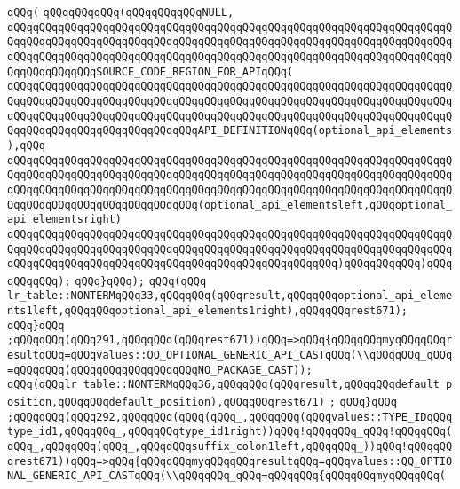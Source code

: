 \verb|qQQq(|\newline
\verb|qQQqqQQqqQQq(qQQqqQQqqQQqNULL,|\newline
\verb|qQQqqQQqqQQqqQQqqQQqqQQqqQQqqQQqqQQqqQQqqQQqqQQqqQQqqQQqqQQqqQQqqQQqqQQqqQQqqQQqqQQqqQQqqQQqqQQqqQQqqQQqqQQqqQQqqQQqqQQqqQQqqQQqqQQqqQQqqQQqqQQqqQQqqQQqqQQqqQQqqQQqqQQqqQQqqQQqqQQqqQQqqQQqqQQqqQQqqQQqqQQqqQQqqQQqqQQqqQQqqQQqSOURCE_CODE_REGION_FOR_APIqQQq(|\newline
\verb|qQQqqQQqqQQqqQQqqQQqqQQqqQQqqQQqqQQqqQQqqQQqqQQqqQQqqQQqqQQqqQQqqQQqqQQqqQQqqQQqqQQqqQQqqQQqqQQqqQQqqQQqqQQqqQQqqQQqqQQqqQQqqQQqqQQqqQQqqQQqqQQqqQQqqQQqqQQqqQQqqQQqqQQqqQQqqQQqqQQqqQQqqQQqqQQqqQQqqQQqqQQqqQQqqQQqqQQqqQQqqQQqqQQqqQQqqQQqqQQqAPI_DEFINITIONqQQq(optional_api_elements),qQQq|\newline
\verb|qQQqqQQqqQQqqQQqqQQqqQQqqQQqqQQqqQQqqQQqqQQqqQQqqQQqqQQqqQQqqQQqqQQqqQQqqQQqqQQqqQQqqQQqqQQqqQQqqQQqqQQqqQQqqQQqqQQqqQQqqQQqqQQqqQQqqQQqqQQqqQQqqQQqqQQqqQQqqQQqqQQqqQQqqQQqqQQqqQQqqQQqqQQqqQQqqQQqqQQqqQQqqQQqqQQqqQQqqQQqqQQqqQQqqQQqqQQqqQQq(optional_api_elementsleft,qQQqoptional_api_elementsright)|\newline
\verb|qQQqqQQqqQQqqQQqqQQqqQQqqQQqqQQqqQQqqQQqqQQqqQQqqQQqqQQqqQQqqQQqqQQqqQQqqQQqqQQqqQQqqQQqqQQqqQQqqQQqqQQqqQQqqQQqqQQqqQQqqQQqqQQqqQQqqQQqqQQqqQQqqQQqqQQqqQQqqQQqqQQqqQQqqQQqqQQqqQQqqQQqqQQqqQQq)qQQqqQQqqQQq)qQQqqQQqqQQq);|\newline
\verb|qQQq}qQQq);|\newline
\verb|qQQq(qQQq|\newline
\verb|lr_table::NONTERMqQQq33,qQQqqQQq(qQQqresult,qQQqqQQqoptional_api_elements1left,qQQqqQQqoptional_api_elements1right),qQQqqQQqrest671);|\newline
\verb|qQQq}qQQq|\newline
\verb|;qQQqqQQq(qQQq291,qQQqqQQq(qQQqrest671))qQQq=>qQQq{qQQqqQQqmyqQQqqQQqresultqQQq=qQQqvalues::QQ_OPTIONAL_GENERIC_API_CASTqQQq(\\qQQqqQQq_qQQq=qQQqqQQq(qQQqqQQqqQQqqQQqqQQqNO_PACKAGE_CAST));|\newline
\verb|qQQq(qQQqlr_table::NONTERMqQQq36,qQQqqQQq(qQQqresult,qQQqqQQqdefault_position,qQQqqQQqdefault_position),qQQqqQQqrest671)|\newline
\verb|;|\newline
\verb|qQQq}qQQq|\newline
\verb|;qQQqqQQq(qQQq292,qQQqqQQq(qQQq(qQQq_,qQQqqQQq(qQQqvalues::TYPE_IDqQQqtype_id1,qQQqqQQq_,qQQqqQQqtype_id1right))qQQq!qQQqqQQq_qQQq!qQQqqQQq(qQQq_,qQQqqQQq(qQQq_,qQQqqQQqsuffix_colon1left,qQQqqQQq_))qQQq!qQQqqQQqrest671))qQQq=>qQQq{qQQqqQQqmyqQQqqQQqresultqQQq=qQQqvalues::QQ_OPTIONAL_GENERIC_API_CASTqQQq(\\qQQqqQQq_qQQq=qQQqqQQq{qQQqqQQqmyqQQqqQQq(|\newline
